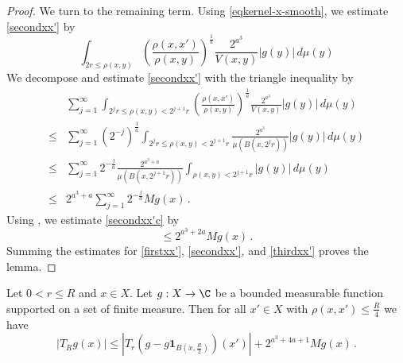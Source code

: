 \begin{proof}
We turn to the remaining term. Using \eqref{eqkernel-x-smooth}, we estimate \eqref{secondxx'} by
\begin{equation}\label{secondxx'b}
 \int_{2r\le\rho(x,y)} \left(\frac{\rho(x,x')}{\rho(x,y)}\right)^{\frac{1}{a}}\frac{2^{a^3}}{V(x,y)} |g(y)| \,d\mu(y)
\end{equation}
We decompose and estimate
\eqref{secondxx'}
with the triangle inequality by
\begin{align}
 &\sum_{j=1}^\infty  \int_{2^jr\le\rho(x,y)< 2^{j+1}r}
 \left(\frac{\rho(x,x')}{\rho(x,y)}\right)^{\frac{1}{a}}\frac{2^{a^3}}{V(x,y)} |g(y)| \,d\mu(y)\, \\
 \le&
 \sum_{j=1}^\infty \left( 2^{-j} \right)^{\frac{1}{a}} \int_{2^jr\le\rho(x,y)< 2^{j+1}r} \frac{2^{a^3}}{\mu(B(x,2^j r))} |g(y)| \,d\mu(y) \\
 \le&
\sum_{j=1}^\infty 2^{-\frac{j}{a}} \frac{2^{a^3 + a}}{\mu(B(x,2^{j+1} r))} \int_{\rho(x,y)<2^{j+1}r}
|g(y)| \, d\mu(y) \\
\label{secondxx'c}
\le& 2^{a^3 + a} \sum_{j=1}^\infty 2^{-\frac{j}{a}} Mg(x)\,.
\end{align}
Using , we estimate
\eqref{secondxx'c} by
\begin{equation}\label{secondxx'd}
\le 2^{a^3 + 2a} Mg(x) \,.
\end{equation}
Summing the estimates
for \eqref{firstxx'},
\eqref{secondxx'}, and
\eqref{thirdxx'}
proves the lemma.
\end{proof}

\begin{lemma}
\label{Cotlar-control}
\leanok
{}
Let $0<r\le R$ and  $x\in X$. Let $g:X\to\C$ be a bounded measurable function supported on a set of finite measure.
Then for all $x'\in X$ with $\rho(x,x')\le\frac {R}{4}$ we have
\begin{equation}\label{eq-cotlar-control}
\left|T_R g(x)
\right|\le
|T_r(g-g\mathbf{1}_{B(x,\frac {R} 2)})(x')| +
2^{a^3 + 4a + 1} Mg(x)\, .
\end{equation}
\end{lemma}

